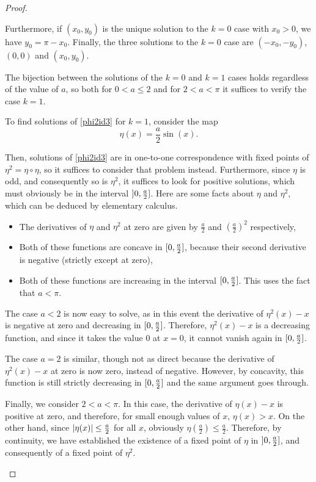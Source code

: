 \begin{proof}
\begin{lemma}
Furthermore, if $(x_0, y_0)$ is the unique solution to the $k=0$ case with $x_0 > 0$, we have $y_0 = \pi - x_0$. Finally, the three solutions to the $k = 0$ case are $(-x_0, -y_0)$, $(0,0)$ and $(x_0, y_0)$.
\end{lemma}

\begin{lemmaproof}
The bijection between the solutions of the $k=0$ and $k=1$ cases holds regardless of the value of $a$, so both for $0<a\leq 2$ and for $2<a<\pi$ it suffices to verify the case $k=1$.

To find solutions of \eqref{phi2id3} for $k=1$, consider the map
\begin{equation}
\eta(x) = \frac a 2 \sin(x).
\end{equation}

Then, solutions of \eqref{phi2id3} are in one-to-one correspondence with fixed points of $\eta^2 = \eta \circ \eta$, so it suffices to consider that problem instead. Furthermore, since $\eta$ is odd, and consequently so is $\eta^2$, it suffices to look for positive solutions, which must obviously be in the interval $\linterval 0 {\frac a 2}$. Here are some facts about $\eta$ and $\eta^2$, which can be deduced by elementary calculus.
\begin{itemize}
\item The derivatives of $\eta$ and $\eta^2$ at zero are given by $\frac a 2$ and $\left( \frac a 2 \right)^2$ respectively,
\item Both of these functions are concave in $\interval 0 {\frac a 2}$, because their second derivative is negative (strictly except at zero),
\item Both of these functions are increasing in the interval $\interval 0 {\frac a 2}$. This uses the fact that $a < \pi$.	
\end{itemize}

The case $a < 2$ is now easy to solve, as in this event the derivative of $\eta^2(x) - x$ is negative at zero and decreasing in $\interval 0 {\frac a 2}$. Therefore, $\eta^2(x) - x$ is a decreasing function, and since it takes the value $0$ at $x = 0$, it cannot vanish again in $\interval0{\frac a 2}$.

The case $a = 2$ is similar, though not as direct because the derivative of $\eta^2(x) - x$ at zero is now zero, instead of negative. However, by concavity, this function is still strictly decreasing in $\interval 0 {\frac a 2}$ and the same argument goes through.

Finally, we consider $2 < a < \pi$. In this case, the derivative of $\eta(x) - x$ is positive at zero, and therefore, for small enough values of $x$, $\eta(x) > x$. On the other hand, since $\lvert\eta(x)\rvert \leq \frac a 2$ for all $x$, obviously $\eta(\frac a 2) \leq \frac a 2$. Therefore, by continuity, we have established the existence of a fixed point of $\eta$ in $\linterval 0 {\frac a 2}$, and consequently of a fixed point of $\eta^2$.


\end{lemmaproof}
\end{proof}
